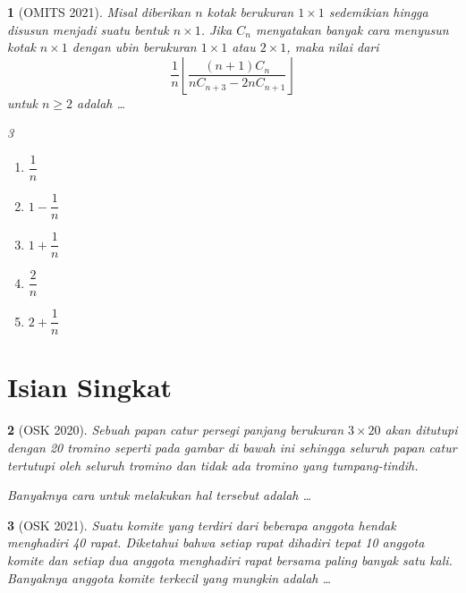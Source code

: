 \documentclass[11pt,a4paper,DIV=12]{scrartcl}
\theoremstyle{justnumber}
\newtheorem{problem}{}
\begin{document}
\begin{problem}[OMITS 2021]
  Misal diberikan $n$ kotak berukuran $1 \times 1$ sedemikian hingga disusun menjadi suatu bentuk $n \times 1$. Jika $C_n$ menyatakan banyak cara menyusun kotak $n \times 1$ dengan ubin berukuran $1 \times 1$ atau $2 \times 1$, maka nilai dari
  \[
    \frac{1}{n} \left\lfloor \frac{(n+1)C_n}{nC_{n+3} - 2nC_{n+1}} \right\rfloor
  \]
  untuk $n \geq 2$ adalah \ldots

  \begin{multicols}{3}
    \begin{enumerate}
      \item[(a)] $\dfrac{1}{n}$
      \item[(b)] $1 - \dfrac{1}{n}$
      \item[(c)] $1 + \dfrac{1}{n}$
      \item[(d)] $\dfrac{2}{n}$
      \item[(e)] $2 + \dfrac{1}{n}$
    \end{enumerate}
  \end{multicols}
\end{problem}

\section*{Isian Singkat}
\begin{problem}[OSK 2020]
  Sebuah papan catur persegi panjang berukuran $3 \times 20$ akan ditutupi dengan 20 tromino seperti pada gambar di bawah ini sehingga seluruh papan catur tertutupi oleh seluruh tromino dan tidak ada tromino yang tumpang-tindih.
  \begin{center}
  \end{center}
  Banyaknya cara untuk melakukan hal tersebut adalah \ldots
\end{problem}

\begin{problem}[OSK 2021]
  Suatu komite yang terdiri dari beberapa anggota hendak menghadiri 40 rapat. Diketahui bahwa setiap rapat dihadiri tepat 10 anggota komite dan setiap dua anggota menghadiri rapat bersama paling banyak satu kali. Banyaknya anggota komite terkecil yang mungkin adalah \ldots
\end{problem}
\end{document}
